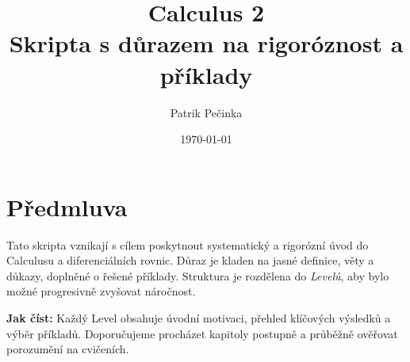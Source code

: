 \documentclass[a4paper,12pt]{article}
\title{\textbf{Calculus 2}\\\large Skripta s důrazem na rigoróznost a příklady}
\author{Patrik Pečinka}
\date{\today}
\begin{document}
\maketitle
\thispagestyle{empty}
\clearpage

\section*{Předmluva}
Tato skripta vznikají s cílem poskytnout systematický a rigorózní úvod do Calculusu a diferenciálních rovnic.
Důraz je kladen na jasné definice, věty a důkazy, doplněné o řešené příklady.
Struktura je rozdělena do \emph{Levelů}, aby bylo možné progresivně zvyšovat náročnost.

\bigskip
\noindent\textbf{Jak číst:}
Každý Level obsahuje úvodní motivaci, přehled klíčových výsledků a výběr příkladů.
Doporučujeme procházet kapitoly postupně a průběžně ověřovat porozumění na cvičeních.

\clearpage

\setcounter{secnumdepth}{3}   %
\setcounter{tocdepth}{2}      %
\tableofcontents
\clearpage


 













% 
% 
% 
% 

\end{document}

